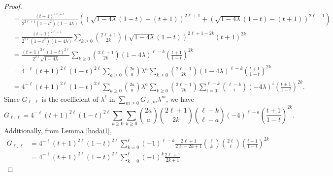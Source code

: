 \documentclass{amsart}
\numberwithin{equation}{section}
\theoremstyle{plain}
\theoremstyle{definition}
\begin{document}
\begin{proof}
\[\begin{aligned}
&=
\frac{(t+1)^{2\ell +1}}{2^{2 \ell +1} (1-t^2) (1 - 4 \lambda)}
\left(
\left(
\sqrt{1 - 4 \lambda} (1-t)+(t+1)
\right)^{2\ell+1}
+
\left(
\sqrt{1 - 4 \lambda} (1-t) -(t+1)
\right)^{2\ell+1}\right)\\
&=
\frac{(t+1)^{2\ell +1}}{2^{2 \ell} (1-t^2) (1 - 4 \lambda)}
\sum_{k\ge 0}
\binom{2\ell+1}{2k}
(\sqrt{1 - 4 \lambda} (1-t))^{2\ell+1-2k}
(t+1)^{2k}
\\
&=
\frac{(t+1)^{2\ell} (1-t)^{2\ell} }{2^{2 \ell} \sqrt{1 - 4 \lambda} }
\sum_{k\ge 0}
\binom{2\ell+1}{2k}
(1-4\lambda)^{\ell-k}
\left(
\frac{t+1}{1-t}
\right)
^{2k}
\\
&=
4^{-\ell} (t+1)^{2\ell} (1-t)^{2\ell}\sum_{a \ge 0}
\binom{2a}{a} \lambda^a
\sum_{k\ge 0}
\binom{2\ell+1}{2k}
(1-4\lambda)^{\ell-k}
\left(
\frac{t+1}{1-t}
\right)
^{2k}
\\
&=
4^{-\ell} (t+1)^{2\ell} (1-t)^{2\ell}
\sum_{a \ge 0}
\binom{2a}{a} \lambda^a
\sum_{k\ge 0}
\binom{2\ell+1}{2k}
\sum_{i=0}^{\ell-k}
\binom{\ell-k}{i}
(-4\lambda)^{i}
\left(
\frac{t+1}{1-t}
\right)
^{2k}.
\end{aligned}\]
Since $G_{\ell, \ell}$ is the coefficient of $\lambda^\ell$ in $\sum_{m \ge 0} G_{\ell, m} \lambda^m$,
we have
\[
G_{\ell, \ell} = 
4^{-\ell} (t+1)^{2\ell} (1-t)^{2\ell}\sum_{a \ge 0}
\sum_{k\ge 0}
\binom{2a}{a} 
\binom{2\ell+1}{2k}
\binom{\ell-k}{\ell-a}
(-4)^{\ell-a}
\left(
\frac{t+1}{1-t}
\right)
^{2k}.
\]
Additionally, from Lemma \ref{hodai1}, 
\[\begin{aligned}
G_{\ell, \ell}&=
4^{-\ell} 
(t+1)^{2\ell} (1-t)^{2\ell}
\sum_{k=0}^\ell
(-1)^{\ell-k}
\frac{2\ell+1}{2 \ell -2k+1}
\binom{\ell}{k} \binom{2\ell}{\ell}
\left(
\frac{t+1}{1-t}
\right)
^{2k}\\
&=
4^{-\ell} 
(t+1)^{2\ell} (1-t)^{2\ell}
\sum_{k=0}^\ell
(-1)^{k}
\frac{2\ell+1}{2k+1}

\end{aligned}\]
\end{proof}
\end{document}

